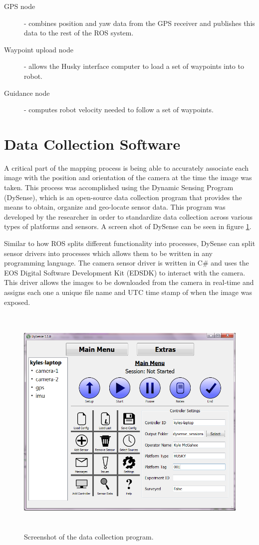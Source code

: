 \begin{description}
\item[GPS node] - combines position and yaw data from the GPS receiver and publishes this data to the rest of the ROS system.
\item[Waypoint upload node] - allows the Husky interface computer to load a set of waypoints into to robot.
\item[Guidance node] - computes robot velocity needed to follow a set of waypoints. 
\end{description}

\section{Data Collection Software}
\label{system-software}

A critical part of the mapping process is being able to accurately associate each image with the position and orientation of the camera at the time the image was taken.  This process was accomplished using the Dynamic Sensing Program (DySense), which is an open-source data collection program that provides the means to obtain, organize and geo-locate sensor data.  This program was developed by the researcher in order to standardize data collection across various types of platforms and sensors.  A screen shot of DySense can be seen in figure \ref{dysense_screenshot}.

Similar to how ROS splits different functionality into processes, DySense can split sensor drivers into processes which allows them to be written in any programming language.  The camera sensor driver is written in C\# and uses the EOS Digital Software Development Kit (EDSDK) to interact with the camera.  This driver allows the images to be downloaded from the camera in real-time and assigns each one a unique file name and UTC time stamp of when the image was exposed.

\begin{figure}[htb]
	\centering
    \includegraphics[height=4.5in]{figures/dysense2.png}
    \caption[Data collection program]{Screenshot of the data collection program.}
    \label{dysense_screenshot}
\end{figure}

